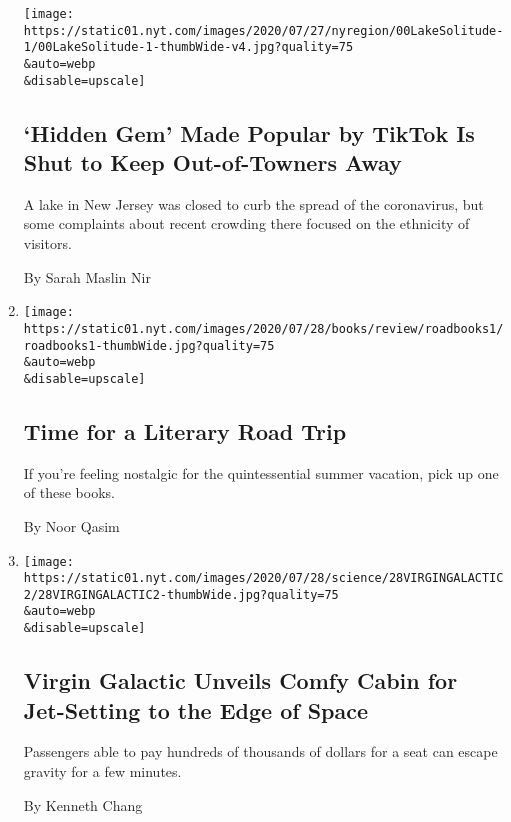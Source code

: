 \begin{enumerate}
  \texttt{[image: https://static01.nyt.com/images/2020/07/27/nyregion/00LakeSolitude-1/00LakeSolitude-1-thumbWide-v4.jpg?quality=75\\\&auto=webp\\\&disable=upscale]}

  \hypertarget{hidden-gem-made-popular-by-tiktok-is-shut-to-keep-out-of-towners-away}{%
  \subsection{`Hidden Gem' Made Popular by TikTok Is Shut to Keep
  Out-of-Towners
  Away}\label{hidden-gem-made-popular-by-tiktok-is-shut-to-keep-out-of-towners-away}}

  A lake in New Jersey was closed to curb the spread of the coronavirus,
  but some complaints about recent crowding there focused on the
  ethnicity of visitors.

  By Sarah Maslin Nir
\item
  \href{/2020/07/28/books/time-for-a-literary-road-trip.html}{}

  \texttt{[image: https://static01.nyt.com/images/2020/07/28/books/review/roadbooks1/roadbooks1-thumbWide.jpg?quality=75\\\&auto=webp\\\&disable=upscale]}

  \hypertarget{time-for-a-literary-road-trip}{%
  \subsection{Time for a Literary Road
  Trip}\label{time-for-a-literary-road-trip}}

  If you're feeling nostalgic for the quintessential summer vacation,
  pick up one of these books.

  By Noor Qasim
\item
  \href{/2020/07/28/science/virgin-galactic-cabin.html}{}

  \texttt{[image: https://static01.nyt.com/images/2020/07/28/science/28VIRGINGALACTIC2/28VIRGINGALACTIC2-thumbWide.jpg?quality=75\\\&auto=webp\\\&disable=upscale]}

  \hypertarget{virgin-galactic-unveils-comfy-cabin-for-jet-setting-to-the-edge-of-space}{%
  \subsection{Virgin Galactic Unveils Comfy Cabin for Jet-Setting to the
  Edge of
  Space}\label{virgin-galactic-unveils-comfy-cabin-for-jet-setting-to-the-edge-of-space}}

  Passengers able to pay hundreds of thousands of dollars for a seat can
  escape gravity for a few minutes.

  By Kenneth Chang
\end{enumerate}

